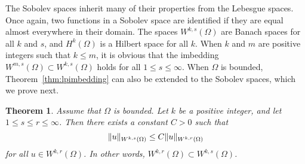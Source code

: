\documentclass[english, 12pt, a4paper, sci, utf8, a-2b, online]{aaltothesis}
\theoremstyle{definition}
\theoremstyle{plain}
\newtheorem{theorem}{Theorem}[section]
\DeclarePairedDelimiter\norm{\lVert}{\rVert}
\numberwithin{equation}{section}
\begin{document}
The Sobolev spaces inherit many of their properties from the Lebesgue spaces.
Once again, two functions in a Sobolev space are identified
if they are equal almost everywhere in their domain.
The spaces $W^{k,s}(\Omega)$ are Banach spaces for all $k$ and $s$,
and $H^k(\Omega)$ is a Hilbert space for all $k$.
When $k$ and $m$ are positive integers such that $k \leq m$,
it is obvious that the imbedding
$W^{m,s}(\Omega) \subset W^{k,s}(\Omega)$ holds for all $1 \leq s \leq \infty$.
When $\Omega$ is bounded, Theorem~\ref{thm:lpimbedding}
can also be extended to the Sobolev spaces, which we prove next.
\begin{theorem}
    \label{thm:sobolevlpimbedding}
    Assume that $\Omega$ is bounded. Let $k$ be a positive integer, and let
    $1 \leq s \leq r \leq \infty$. Then there exists a constant $C > 0$
    such that
    \begin{equation*}
        \norm{u}_{W^{k,s}(\Omega)} \leq C \norm{u}_{W^{k,r}(\Omega)}
    \end{equation*}
    for all $u \in W^{k,r}(\Omega)$. In other words,
    $W^{k,r}(\Omega) \subset W^{k,s}(\Omega)$.
\end{theorem}
\end{document}
